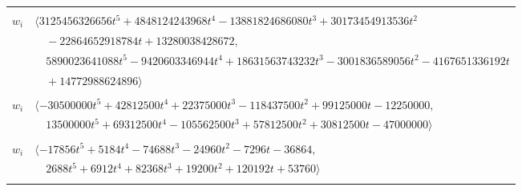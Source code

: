 \documentclass[11pt]{article}
\begin{document}
\begin{longtable}{@{}ll@{}}
\addlinespace[2pt]
\multicolumn{2}{@{}p{0.97\textwidth}@{}}{$i=55$, $D_i=3359232$, $\rho_{ij}$: $0{:}3, \allowbreak 1{:}1, \allowbreak 7{:}1, \allowbreak 24{:}3, \allowbreak 26{:}1, \allowbreak 27{:}2, \allowbreak 29{:}3, \allowbreak 34{:}3, \allowbreak 44{:}1, \allowbreak 50{:}3, \allowbreak 56{:}3, \allowbreak 61{:}3, \allowbreak 73{:}2, \allowbreak 76{:}3, \allowbreak 77{:}2, \allowbreak 79{:}2$}\\
$w_i$ & $\langle 3125456326656t^{5}+4848124243968t^{4}-13881824686080t^{3}+30173454913536t^{2}$\\
 & $\quad -22864652918784t+13280038428672,$\\
 & $\quad 5890023641088t^{5}-9420603346944t^{4}+18631563743232t^{3}-3001836589056t^{2}-4167651336192t$\\
 & $\quad +14772988624896\rangle$\\
\addlinespace[2pt]
\multicolumn{2}{@{}p{0.97\textwidth}@{}}{$i=56$, $D_i=31250$, $\rho_{ij}$: $6{:}2, \allowbreak 17{:}3, \allowbreak 20{:}3, \allowbreak 27{:}1, \allowbreak 34{:}2, \allowbreak 38{:}1, \allowbreak 42{:}2, \allowbreak 44{:}2, \allowbreak 50{:}2, \allowbreak 54{:}1, \allowbreak 55{:}1, \allowbreak 60{:}2, \allowbreak 64{:}2, \allowbreak 77{:}3$}\\
$w_i$ & $\langle -30500000t^{5}+42812500t^{4}+22375000t^{3}-118437500t^{2}+99125000t-12250000,$\\
 & $\quad 13500000t^{5}+69312500t^{4}-105562500t^{3}+57812500t^{2}+30812500t-47000000\rangle$\\
\addlinespace[2pt]
\multicolumn{2}{@{}p{0.97\textwidth}@{}}{$i=57$, $D_i=32$, $\rho_{ij}$: $3{:}3, \allowbreak 4{:}1, \allowbreak 7{:}3, \allowbreak 8{:}1, \allowbreak 23{:}1, \allowbreak 36{:}1, \allowbreak 46{:}3, \allowbreak 59{:}3, \allowbreak 62{:}1, \allowbreak 63{:}1, \allowbreak 64{:}3, \allowbreak 70{:}2, \allowbreak 72{:}3, \allowbreak 81{:}2$}\\
$w_i$ & $\langle -17856t^{5}+5184t^{4}-74688t^{3}-24960t^{2}-7296t-36864,$\\
 & $\quad 2688t^{5}+6912t^{4}+82368t^{3}+19200t^{2}+120192t+53760\rangle$\\
\addlinespace[2pt]
\multicolumn{2}{@{}p{0.97\textwidth}@{}}{$i=58$, $D_i=1$, $\rho_{ij}$: $3{:}1, \allowbreak 9{:}3, \allowbreak 16{:}3, \allowbreak 17{:}3, \allowbreak 18{:}1, \allowbreak 19{:}2, \allowbreak 21{:}1, \allowbreak 26{:}3, \allowbreak 29{:}1, \allowbreak 49{:}2, \allowbreak 51{:}2, \allowbreak 65{:}1, \allowbreak 67{:}1, \allowbreak 68{:}3, \allowbreak 74{:}3$}\\

\end{longtable}
\end{document}
